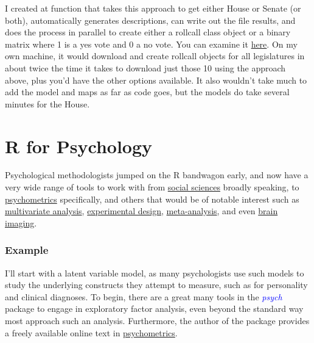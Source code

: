 \documentclass[english,nohyper,titlepage]{tufte-handout}\usepackage[]{graphicx}\usepackage[]{color}
\begin{document}
I created at function that takes this approach to get either House or Senate (or both), automatically generates descriptions, can write out the file results, and does the process in parallel to create either a rollcall class object or a binary matrix where 1 is a yes vote and 0 a no vote.   You can examine it \href{https://github.com/mclark--/Miscellaneous-R-Code/blob/master/Other/getRollCall.R}{here}.  On my own machine, it would download and create rollcall objects for all legislatures in about twice the time it takes to download just those 10 using the approach above, plus you'd have the other options available.  It also wouldn't take much to add the model and maps as far as code goes, but the models do take several minutes for the House.







\part{R for Psychology}
Psychological methodologists jumped on the R bandwagon early, and now have a very wide range of tools to work with from \href{http://cran.r-project.org/web/views/SocialSciences.html}{social sciences} broadly speaking, to \href{http://cran.r-project.org/web/views/Psychometrics.html}{psychometrics} specifically, and others that would be of notable interest such as \href{http://cran.r-project.org/web/views/Multivariate.html}{multivariate analysis}, \href{http://cran.r-project.org/web/views/ExperimentalDesign.html}{experimental design}, \href{http://cran.r-project.org/web/views/MetaAnalysis.html}{meta-analysis}, and even \href{http://cran.r-project.org/web/views/MedicalImaging.html}{brain imaging}.


\section{Example}
I'll start with a latent variable model, as many psychologists use such models to study the underlying constructs they attempt to measure, such as for personality and clinical diagnoses.  To begin, there are a great many tools in the \emph{\textcolor{blue}{psych}} package to engage in exploratory factor analysis, even beyond the standard way most approach such an analysis.  Furthermore, the author of the package provides a freely available online text in \href{http://personality-project.org/revelle.html}{psychometrics}.
\end{document}
